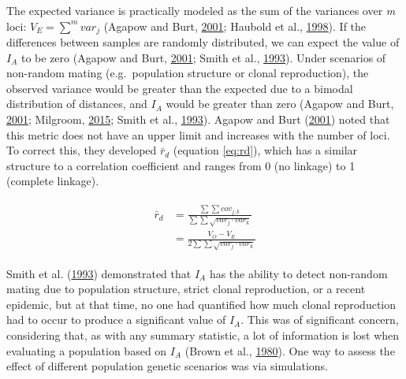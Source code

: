 \documentclass[double,12pt]{beavtex}
\begin{document}
  The expected variance is practically modeled as the sum of the variances
  over \emph{m} loci: \(V_E = \sum^m{var_j}\) (Agapow and Burt,
  \protect\hyperlink{ref-Agapowux5f2001}{2001}; Haubold et al.,
  \protect\hyperlink{ref-haubold1998detecting}{1998}). If the differences
  between samples are randomly distributed, we can expect the value of
  \(I_A\) to be zero (Agapow and Burt,
  \protect\hyperlink{ref-Agapowux5f2001}{2001}; Smith et al.,
  \protect\hyperlink{ref-smith1993how}{1993}). Under scenarios of
  non-random mating (e.g.~population structure or clonal reproduction),
  the observed variance would be greater than the expected due to a
  bimodal distribution of distances, and \(I_A\) would be greater than
  zero (Agapow and Burt, \protect\hyperlink{ref-Agapowux5f2001}{2001};
  Milgroom, \protect\hyperlink{ref-milgroom2015population}{2015}; Smith et
  al., \protect\hyperlink{ref-smith1993how}{1993}). Agapow and Burt
  (\protect\hyperlink{ref-Agapowux5f2001}{2001}) noted that this metric
  does not have an upper limit and increases with the number of loci. To
  correct this, they developed \(\bar{r}_d\) (equation \eqref{eq:rd}), which
  has a similar structure to a correlation coefficient and ranges from 0
  (no linkage) to 1 (complete linkage).
  
  \begin{align} %
  \begin{split} %
  \bar{r}_d &= \frac{\sum\sum{cov_{j,k}}}{
                     \sum\sum{\sqrt{var_{j} \cdot var_{k}}}} \\
            &= \frac{V_O - V_E}{2\sum\sum{\sqrt{var_{j} \cdot var_{k}}}}
  \end{split}
  \label{eq:rd}
  \end{align}
  
  Smith et al. (\protect\hyperlink{ref-smith1993how}{1993}) demonstrated
  that \(I_A\) has the ability to detect non-random mating due to
  population structure, strict clonal reproduction, or a recent epidemic,
  but at that time, no one had quantified how much clonal reproduction had
  to occur to produce a significant value of \(I_A\). This was of
  significant concern, considering that, as with any summary statistic, a
  lot of information is lost when evaluating a population based on \(I_A\)
  (Brown et al., \protect\hyperlink{ref-brown1980multilocus}{1980}). One
  way to assess the effect of different population genetic scenarios was
  via simulations.
  
\end{document}
